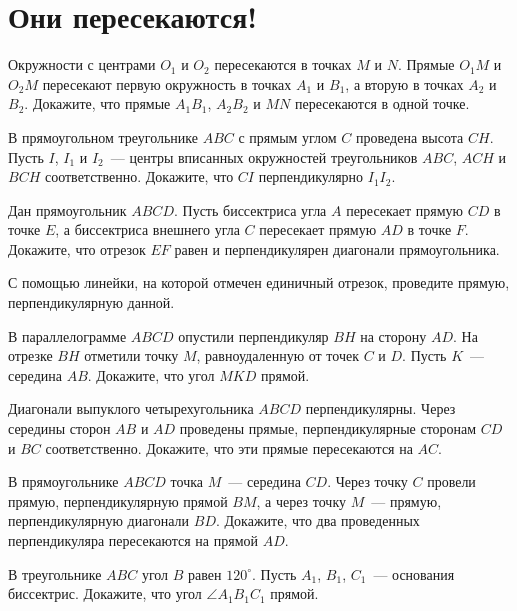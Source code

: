 

\section*{Они пересекаются!}


\begin{problems}

\item
Окружности с центрами $O_1$ и $O_2$ пересекаются в точках $M$ и $N$.
Прямые $O_1 M$ и $O_2 M$ пересекают первую окружность в точках $A_1$ и $B_1$, а
вторую в точках $A_2$ и $B_2$.
Докажите, что прямые $A_1 B_1$, $A_2 B_2$ и $MN$ пересекаются в одной точке.

\item
В прямоугольном треугольнике $ABC$ с прямым углом $C$ проведена высота $CH$.
Пусть $I$, $I_1$ и $I_2$~--- центры вписанных окружностей треугольников
$ABC$, $ACH$ и $BCH$ соответственно.
Докажите, что $CI$ перпендикулярно $I_1 I_2$.

\item
Дан прямоугольник $ABCD$.
Пусть биссектриса угла $A$ пересекает прямую $CD$ в точке $E$, а биссектриса
внешнего угла $C$ пересекает прямую $AD$ в точке $F$.
Докажите, что отрезок $EF$ равен и перпендикулярен диагонали прямоугольника.

\item
С помощью линейки, на которой отмечен единичный отрезок, проведите прямую,
перпендикулярную данной.

\item
В параллелограмме $ABCD$ опустили перпендикуляр $BH$ на сторону $AD$.
На отрезке $BH$ отметили точку $M$, равноудаленную от точек $C$ и $D$.
Пусть $K$~--- середина $AB$.
Докажите, что угол $MKD$ прямой.

\item
Диагонали выпуклого четырехугольника $ABCD$ перпендикулярны.
Через середины сторон $AB$ и $AD$ проведены прямые, перпендикулярные сторонам
$CD$ и $BC$ соответственно.
Докажите, что эти прямые пересекаются на $AC$.

\item
В прямоугольнике $ABCD$ точка $M$~--- середина $CD$.
Через точку $C$ провели прямую, перпендикулярную прямой $BM$, а через точку
$M$~--- прямую, перпендикулярную диагонали $BD$.
Докажите, что два проведенных перпендикуляра пересекаются на прямой $AD$.

\item
В треугольнике $ABC$ угол $B$ равен $120^\circ$.
Пусть $A_1$, $B_1$, $C_1$~--- основания биссектрис.
Докажите, что угол $\angle A_1 B_1 C_1$ прямой.

\end{problems}

